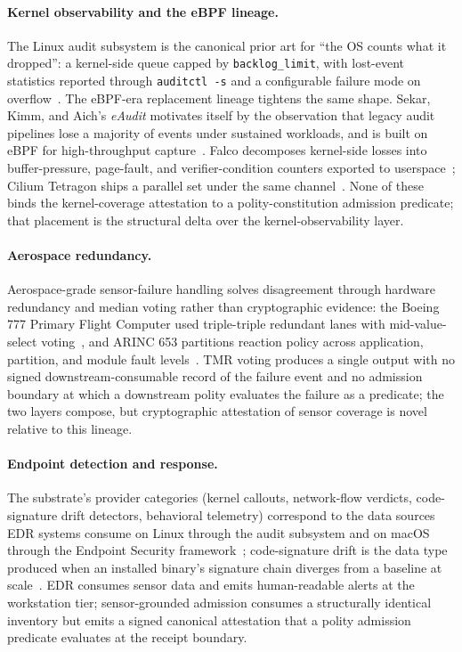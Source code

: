 \paragraph{Kernel observability and the eBPF lineage.}
The Linux audit subsystem is the canonical prior art for ``the OS counts what it dropped'': a kernel-side queue capped by \texttt{backlog\_limit}, with lost-event statistics reported through \texttt{auditctl -s} and a configurable failure mode on overflow~\cite{linuxAuditSubsystem}. The eBPF-era replacement lineage tightens the same shape. Sekar, Kimm, and Aich's \emph{eAudit} motivates itself by the observation that legacy audit pipelines lose a majority of events under sustained workloads, and is built on eBPF for high-throughput capture~\cite{sekarEAudit2024}. Falco decomposes kernel-side losses into buffer-pressure, page-fault, and verifier-condition counters exported to userspace~\cite{falcoProject2025}; Cilium Tetragon ships a parallel set under the same channel~\cite{tetragonProject2025}. None of these binds the kernel-coverage attestation to a polity-constitution admission predicate; that placement is the structural delta over the kernel-observability layer.

\paragraph{Aerospace redundancy.}
Aerospace-grade sensor-failure handling solves disagreement through hardware redundancy and median voting rather than cryptographic evidence: the Boeing 777 Primary Flight Computer used triple-triple redundant lanes with mid-value-select voting~\cite{yeh1996Boeing777}, and ARINC 653 partitions reaction policy across application, partition, and module fault levels~\cite{arinc653Standard}. TMR voting produces a single output with no signed downstream-consumable record of the failure event and no admission boundary at which a downstream polity evaluates the failure as a predicate; the two layers compose, but cryptographic attestation of sensor coverage is novel relative to this lineage.

\paragraph{Endpoint detection and response.}
The substrate's provider categories (kernel callouts, network-flow verdicts, code-signature drift detectors, behavioral telemetry) correspond to the data sources EDR systems consume on Linux through the audit subsystem and on macOS through the Endpoint Security framework~\cite{applePlatformSecurity2024}; code-signature drift is the data type produced when an installed binary's signature chain diverges from a baseline at scale~\cite{kotziasUnwantedApps2021}. EDR consumes sensor data and emits human-readable alerts at the workstation tier; sensor-grounded admission consumes a structurally identical inventory but emits a signed canonical attestation that a polity admission predicate evaluates at the receipt boundary.

